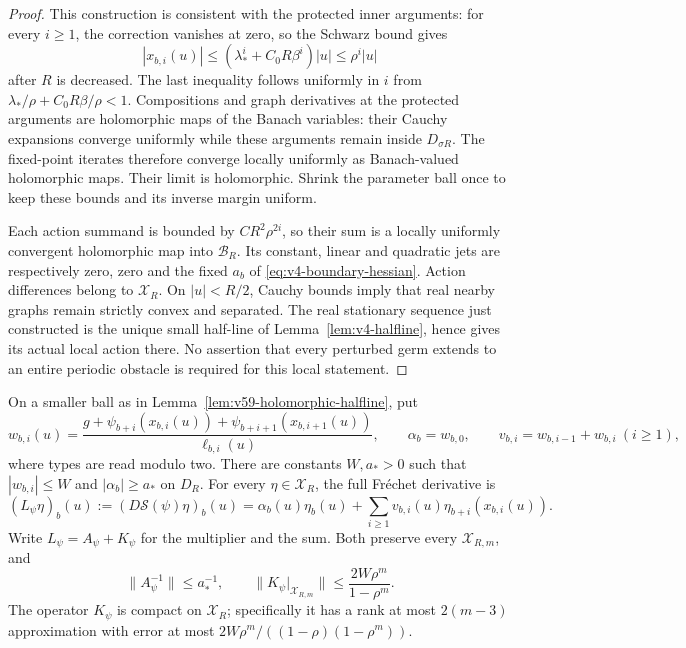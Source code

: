 \begin{proof}
This construction is consistent with the protected inner arguments:
for every $i\ge1$, the correction vanishes at zero, so the Schwarz
bound gives
\[
 |x_{b,i}(u)|\le
       (\lambda_*^i+C_0R\beta^i)|u|\le\rho^i|u|
\]
after $R$ is decreased.  The last inequality follows uniformly in $i$
from $\lambda_*/\rho+C_0R\beta/\rho<1$.
Compositions and graph derivatives at the protected arguments are
holomorphic maps of the Banach variables: their Cauchy expansions
converge uniformly while these arguments remain inside $D_{\sigma R}$.
The fixed-point iterates therefore converge locally uniformly as
Banach-valued holomorphic maps.  Their limit is holomorphic.  Shrink the
parameter ball once to keep these bounds and its inverse margin uniform.

Each action summand is bounded by $CR^2\rho^{2i}$, so their sum is a
locally uniformly convergent holomorphic map into $\mathscr B_R$.
Its constant, linear and quadratic jets are respectively zero, zero and
the fixed $a_b$ of \eqref{eq:v4-boundary-hessian}.  Action differences
belong to $\mathscr X_R$.  On $|u|<R/2$, Cauchy bounds imply that real
nearby graphs remain strictly convex and separated.  The real
stationary sequence just constructed is the unique small half-line of
Lemma~\ref{lem:v4-halfline}, hence gives its actual local action there.
No assertion that every perturbed germ extends to an entire periodic
obstacle is required for this local statement.
\end{proof}

\begin{lemma}
\label{lem:v59-envelope-operator}
On a smaller ball as in Lemma~\ref{lem:v59-holomorphic-halfline}, put
\[
 w_{b,i}(u)=\frac{g+\psi_{b+i}(x_{b,i}(u))+
                           \psi_{b+i+1}(x_{b,i+1}(u))}
                         {\ell_{b,i}(u)},\qquad
 \alpha_b=w_{b,0},\qquad v_{b,i}=w_{b,i-1}+w_{b,i}\ (i\ge1),
\]
where types are read modulo two.  There are constants $W,a_*>0$ such
that $|w_{b,i}|\le W$ and $|\alpha_b|\ge a_*$ on $D_R$.
For every $\eta\in\mathscr X_R$, the full Fr\'echet derivative is
\begin{equation}\label{eq:v59-full-envelope}
 (L_\psi\eta)_b(u):=(D\mathscr S(\psi)\eta)_b(u)
 =\alpha_b(u)\eta_b(u)
       +\sum_{i\ge1}v_{b,i}(u)\eta_{b+i}(x_{b,i}(u)).
\end{equation}
Write $L_\psi=A_\psi+K_\psi$ for the multiplier and the sum.
Both preserve every $\mathscr X_{R,m}$, and
\begin{equation}\label{eq:v59-tail-bound}
 \|A_\psi^{-1}\|\le a_*^{-1},\qquad
 \|K_\psi|_{\mathscr X_{R,m}}\|
                    \le\frac{2W\rho^m}{1-\rho^m}.
\end{equation}
The operator $K_\psi$ is compact on $\mathscr X_R$; specifically it
has a rank at most $2(m-3)$ approximation with error at most
$2W\rho^m/((1-\rho)(1-\rho^m))$.
\end{lemma}

